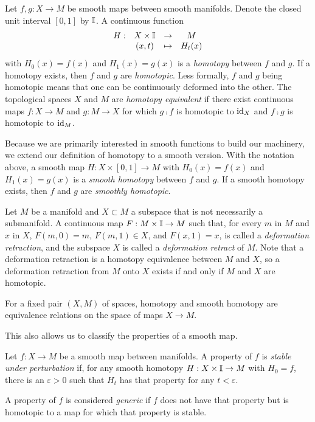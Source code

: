 \begin{defn}[Homotopy]
	\label{def:homotopy}
	Let $f,g:X\to M$ be smooth maps between smooth manifolds.
	Denote the closed unit interval $[0,1]$ by $\mathbb{I}$.
	A continuous function 
	\[
		\begin{array}{cccc}
			H: & X\times \mathbb{I} & \to & M \\
			& (x,t)	& \mapsto & H_t(x)
		\end{array}
	\]
	with $H_0(x)=f(x)$ and $H_1(x)=g(x)$ is a \emph{homotopy} between $f$ and $g$.
	If a homotopy exists, then $f$ and $g$ are \emph{homotopic}.
	Less formally, $f$ and $g$ being homotopic means that one can be continuously deformed into the other.
	The topological spaces $X$ and $M$ are \emph{homotopy equivalent} if there exist continuous maps $f:X\to M$ and $g:M\to X$ for which $g\comp f$ is homotopic to $\textrm{id}_{X}$ and $f\comp g$ is homotopic to $\textrm{id}_{M}$.
	
	Because we are primarily interested in smooth functions to build our machinery, we extend our definition of homotopy to a smooth version.
	With the notation above, a smooth map $H:X\times[0,1]\to M$ with $H_0(x)=f(x)$ and $H_1(x)=g(x)$ is a \emph{smooth homotopy} between $f$ and $g$.
	If a smooth homotopy exists, then $f$ and $g$ are \emph{smoothly homotopic}.
	
	Let $M$ be a manifold and $X\subset M$ a subspace that is not necessarily a submanifold.
	A continuous map $F:M\times\mathbb{I}\to M$ such that, for every $m$ in $M$ and $x$ in $X$, $F(m,0)=m$, $F(m,1)\in X$, and $F(x,1)=x$, is called a \emph{deformation retraction}, and the subspace $X$ is called a \emph{deformation retract} of $M$.
	Note that a deformation retraction is a homotopy equivalence between $M$ and $X$, so a deformation retraction from $M$ onto $X$ exists if and only if $M$ and $X$ are homotopic.
\end{defn}

\begin{prop}
	For a fixed pair $(X,M)$ of spaces, homotopy and smooth homotopy are equivalence relations on the space of maps $X\to M$.
\end{prop}

This also allows us to classify the properties of a smooth map.

\begin{defn}
	Let $f:X\to M$ be a smooth map between manifolds.
	A property of $f$ is \emph{stable under perturbation} if, for any smooth homotopy $H:X\times \mathbb{I}\to M$ with $H_0=f$, there is an $\varepsilon>0$ such that $H_t$ has that property for any $t<\varepsilon$.
	
	A property of $f$ is considered \emph{generic} if $f$ does not have that property but is homotopic to a map for which that property is stable.
\end{defn}

